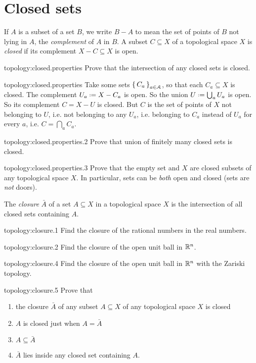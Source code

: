 \section{Closed sets}
If \(A\) is a subset of a set \(B\), we write \(B-A\) to mean the set of points of \(B\) not lying in \(A\), the \emph{complement} of \(A\) in \(B\).
A subset \(C \subseteq X\) of a topological space \(X\) is \emph{closed} if its complement \(X - C \subseteq X\) is open.
\begin{problem}{topology:closed.properties}
Prove that the intersection of any closed sets is closed.
\end{problem}
\begin{answer}{topology:closed.properties}
Take some sets \(\set{C_a}_{a \in \mathcal{A}}\), so that each \(C_a \subseteq X\) is closed.
The complement \(U_a\defeq X-C_a\) is open.
So the union \(U \defeq \bigcup_a U_a\) is open.
So its complement \(C=X-U\) is closed.
But \(C\) is the set of points of \(X\) not belonging to \(U\), i.e. not belonging to any \(U_a\), i.e. belonging to \(C_a\) instead of \(U_a\) for every \(a\), i.e. \(C=\bigcap_a C_a\).
\end{answer}
\begin{problem}{topology:closed.properties.2}
Prove that union of finitely many closed sets is closed.
\end{problem}
\begin{problem}{topology:closed.properties.3}
Prove that the empty set and \(X\) are closed subsets of any topological space \(X\).
In particular, sets can be \emph{both} open and closed (sets are \emph{not} doors).
\end{problem}
The \emph{closure} \(\bar{A}\) of a set \(A \subseteq X\) in a topological space \(X\) is the intersection of all closed sets containing \(A\).
\begin{problem}{topology:closure.1}
Find the closure of the rational numbers in the real numbers.
\end{problem}
\begin{problem}{topology:closure.2}
Find the closure of the open unit ball in \(\mathbb{R}^{n}\).
\end{problem}
\begin{problem}{topology:closure.4}
Find the closure of the open unit ball in \(\mathbb{R}^{n}\) with the Zariski topology.
\end{problem}
\begin{problem}{topology:closure.5}
Prove that 
\begin{enumerate}
\item
the closure \(\bar{A}\) of any subset \(A \subseteq X\) of any topological space \(X\) is closed
\item
\(A\) is closed just when \(A=\bar{A}\)
\item
\(A \subseteq \bar{A}\)
\item
\(\bar{A}\) lies inside any closed set containing \(A\).
\end{enumerate}
\end{problem}


